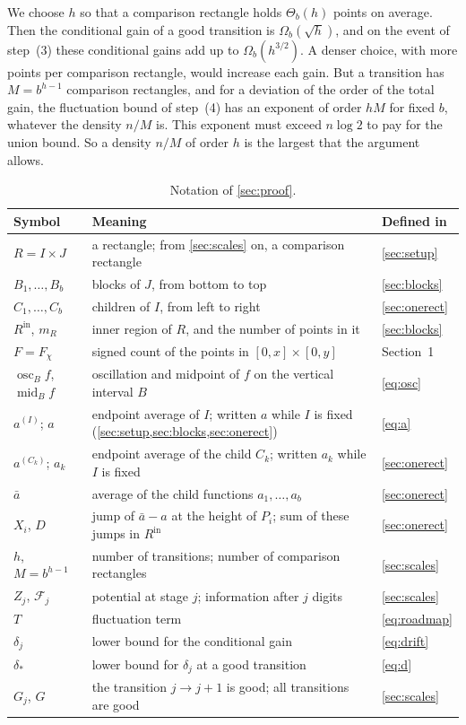 \documentclass[11pt,letterpaper]{article}
\newcommand{\F}{\mathcal{F}}
\newcommand{\1}{\mathbf{1}}
\newcommand{\osc}{\operatorname{osc}}
\newcommand{\midp}{\operatorname{mid}}
\newcommand{\Rin}{R^{\mathrm{in}}}
\begin{document}
We choose $h$ so that a comparison rectangle holds $\Theta_b(h)$ points on average. Then the conditional gain of a good transition is $\Omega_b(\sqrt h)$, and on the event of step~(3) these conditional gains add up to $\Omega_b(h^{3/2})$. A denser choice, with more points per comparison rectangle, would increase each gain. But a transition has $M=b^{h-1}$ comparison rectangles, and for a deviation of the order of the total gain, the fluctuation bound of step~(4) has an exponent of order $hM$ for fixed $b$, whatever the density $n/M$ is. This exponent must exceed $n\log2$ to pay for the union bound. So a density $n/M$ of order $h$ is the largest that the argument allows.

\begin{table}[!b]
\centering
\small
\renewcommand{\arraystretch}{1.2}
\begin{tabular}{@{}lll@{}}
\toprule
Symbol & Meaning & Defined in\\
\midrule
$R=I\times J$ & a rectangle; from \cref{sec:scales} on, a comparison rectangle & \cref{sec:setup}\\
$B_1,\dots,B_b$ & blocks of $J$, from bottom to top & \cref{sec:blocks}\\
$C_1,\dots,C_b$ & children of $I$, from left to right & \cref{sec:onerect}\\
$\Rin$, $m_R$ & inner region of $R$, and the number of points in it & \cref{sec:blocks}\\
\addlinespace[5pt]
$F=F_\chi$ & signed count of the points in $[0,x]\times[0,y]$ & Section~1\\
$\osc_Bf$, $\midp_Bf$ & oscillation and midpoint of $f$ on the vertical interval $B$ & \eqref{eq:osc}\\
$a^{(I)}$; $a$ & endpoint average of $I$; written $a$ while $I$ is fixed (\cref{sec:setup,sec:blocks,sec:onerect}) & \eqref{eq:a}\\
$a^{(C_k)}$; $a_k$ & endpoint average of the child $C_k$; written $a_k$ while $I$ is fixed & \cref{sec:onerect}\\
$\bar a$ & average of the child functions $a_1,\dots,a_b$ & \cref{sec:onerect}\\
$X_i$, $D$ & jump of $\bar a-a$ at the height of $P_i$; sum of these jumps in $\Rin$ & \cref{sec:onerect}\\
\addlinespace[5pt]
$h$, $M=b^{h-1}$ & number of transitions; number of comparison rectangles & \cref{sec:scales}\\
$Z_j$, $\F_j$ & potential at stage $j$; information after $j$ digits & \cref{sec:scales}\\
$T$ & fluctuation term & \eqref{eq:roadmap}\\
$\delta_j$ & lower bound for the conditional gain & \eqref{eq:drift}\\
$\delta_*$ & lower bound for $\delta_j$ at a good transition & \eqref{eq:d}\\
$G_j$, $G$ & the transition $j\to j+1$ is good; all transitions are good & \cref{sec:scales}\\
\bottomrule
\end{tabular}
\caption{Notation of \cref{sec:proof}.}
\label{tab:notation}
\end{table}
\end{document}
